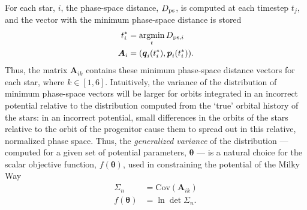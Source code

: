 \documentclass{emulateapj}
\newcommand{\bs}{\boldsymbol}
\newcommand{\argmin}{\operatornamewithlimits{argmin}}
\begin{document}

For each star, $i$,
the phase-space distance, $D_{\rm ps}$, is computed at each timestep
$t_{j}$, and the vector with the minimum phase-space distance is stored
\begin{align}
  t^*_{i} &= \argmin_{t} D_{{\rm ps},i}\\
  \bs{A}_{i} &= (\bs{q}_{i}(t^*_{i}),\bs{p}_{i}(t^*_{i})).
\end{align}
Thus, the matrix $\bs{A}_{ik}$ contains these minimum phase-space
distance vectors for each star, where $k\in[1,6]$. Intuitively, the
variance of the distribution of minimum phase-space vectors will be
larger for orbits integrated in an incorrect potential relative to the
distribution computed from the `true' orbital history of the stars: in
an incorrect potential, small differences in the orbits of the stars
relative to the orbit of the progenitor cause them to spread out in
this relative, normalized phase space. Thus, the \emph{generalized
  variance} of the distribution --- computed for a given set of
potential parameters, $\bs{\theta}$ --- is a natural choice for the
scalar objective function, $f(\bs{\theta})$, used in constraining the potential of the
Milky Way
\begin{align}
  \Sigma_n &= \mathrm{Cov}( \bs{A}_{ik}) \\
  f(\bs{\theta}) &= \ln \det \Sigma_n.
\end{align}

\end{document}
